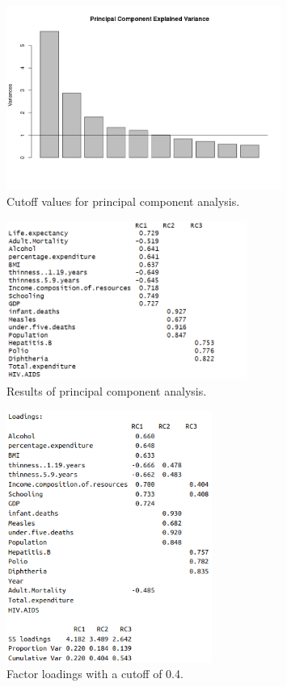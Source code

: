 \documentclass[12pt]{article}
\begin{document}
\begin{figure}[h]
    \centering
    \includegraphics[width=0.8\textwidth]{images/figure_5.png}
    \caption{Cutoff values for principal component analysis.}
    \label{fig:figure_5}
\end{figure}

\begin{figure}[h]
    \centering
    \includegraphics[width=0.7\textwidth]{images/figure_6.png}
    \caption{Results of principal component analysis.}
    \label{fig:figure_6}
\end{figure}

\begin{figure}[h]
    \centering
    \includegraphics[width=0.6\textwidth]{images/figure_7.png}
    \caption{Factor loadings with a cutoff of 0.4.}
    \label{fig:figure_7}
\end{figure}
\end{document}
